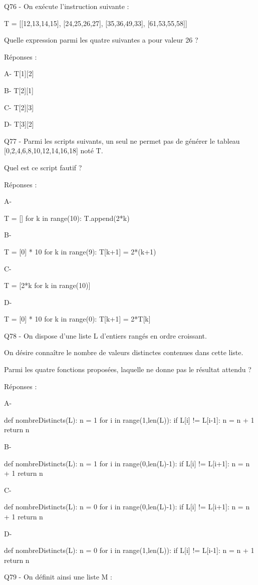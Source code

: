 \documentclass[
]{book}
\begin{document}
Q76 - On exécute l'instruction suivante :

T = {[}{[}12,13,14,15{]},
{[}24,25,26,27{]},
{[}35,36,49,33{]},
{[}61,53,55,58{]}{]}

Quelle expression parmi les quatre suivantes a pour valeur 26 ?

Réponses :

A- T{[}1{]}{[}2{]}

B- T{[}2{]}{[}1{]}

C- T{[}2{]}{[}3{]}

D- T{[}3{]}{[}2{]}

Q77 - Parmi les scripts suivants, un seul ne permet pas de générer le tableau {[}0,2,4,6,8,10,12,14,16,18{]} noté T.

Quel est ce script fautif ?

Réponses :

A-

T = {[}{]}
for k in range(10):
T.append(2*k)

B-

T = {[}0{]} * 10
for k in range(9):
T{[}k+1{]} = 2*(k+1)

C-

T = {[}2*k for k in range(10){]}

D-

T = {[}0{]} * 10
for k in range(0):
T{[}k+1{]} = 2*T{[}k{]}

Q78 - On dispose d'une liste L d'entiers rangés en ordre croissant.

On désire connaître le nombre de valeurs distinctes contenues dans cette liste.

Parmi les quatre fonctions proposées, laquelle ne donne pas le résultat attendu ?

Réponses :

A-

def nombreDistincts(L):
n = 1
for i in range(1,len(L)):
if L{[}i{]} != L{[}i-1{]}:
n = n + 1
return n

B-

def nombreDistincts(L):
n = 1
for i in range(0,len(L)-1):
if L{[}i{]} != L{[}i+1{]}:
n = n + 1
return n

C-

def nombreDistincts(L):
n = 0
for i in range(0,len(L)-1):
if L{[}i{]} != L{[}i+1{]}:
n = n + 1
return n

D-

def nombreDistincts(L):
n = 0
for i in range(1,len(L)):
if L{[}i{]} != L{[}i-1{]}:
n = n + 1
return n

Q79 - On définit ainsi une liste M :
\end{document}
